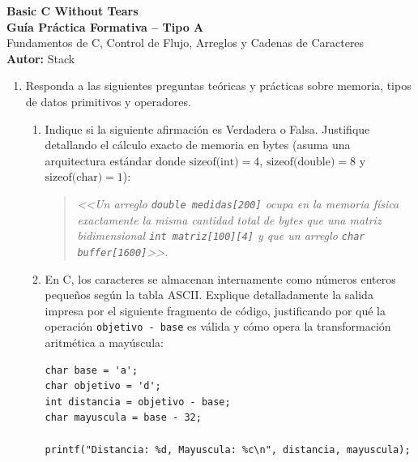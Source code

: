 \documentclass[11pt,letterpaper]{article}
\begin{document}
\begin{center}
    {\LARGE \textbf{Basic C Without Tears}} \\[0.25cm]
    {\Large \textbf{Guía Práctica Formativa -- Tipo A}} \\[0.15cm]
    \small Fundamentos de C, Control de Flujo, Arreglos y Cadenas de Caracteres \\[0.1cm]
    \textbf{Autor:} Stack
\end{center}

\vspace{0.4cm}

\begin{enumerate}[label=\textbf{\arabic*.}]

    \item Responda a las siguientes preguntas teóricas y prácticas sobre memoria, tipos de datos primitivos y operadores.
    
    \begin{enumerate}[label=(\alph*)]
        \item Indique si la siguiente afirmación es Verdadera o Falsa. Justifique detallando el cálculo exacto de memoria en bytes (asuma una arquitectura estándar donde $\text{sizeof(int)} = 4$, $\text{sizeof(double)} = 8$ y $\text{sizeof(char)} = 1$):
        \begin{quote}
            \textit{<<Un arreglo \texttt{double medidas[200]} ocupa en la memoria física exactamente la misma cantidad total de bytes que una matriz bidimensional \texttt{int matriz[100][4]} y que un arreglo \texttt{char buffer[1600]}>>.}
        \end{quote}
        

        \item En C, los caracteres se almacenan internamente como números enteros pequeños según la tabla ASCII. Explique detalladamente la salida impresa por el siguiente fragmento de código, justificando por qué la operación \texttt{objetivo - base} es válida y cómo opera la transformación aritmética a mayúscula:
        \begin{lstlisting}[style=customc, numbers=none]
char base = 'a';
char objetivo = 'd';
int distancia = objetivo - base;
char mayuscula = base - 32;

printf("Distancia: %d, Mayuscula: %c\n", distancia, mayuscula);
        \end{lstlisting}


\end{enumerate}
\end{enumerate}
\end{document}
